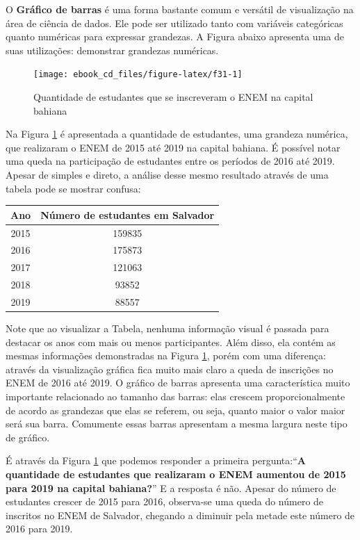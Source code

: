 \documentclass[
  portuguese,
  oneside]{book}
\begin{document}
O \textbf{Gráfico de barras} é uma forma bastante comum e versátil de visualização na área de ciência de dados. Ele pode ser utilizado tanto com variáveis categóricas quanto numéricas para expressar grandezas. A Figura abaixo apresenta uma de suas utilizações: demonstrar grandezas numéricas.

\begin{figure}

{\centering \texttt{[image: ebook\_cd\_files/figure-latex/f31-1]} 

}

\caption{Quantidade de estudantes que se inscreveram o ENEM na capital bahiana}\label{fig:f31}
\end{figure}

Na Figura \ref{fig:f31} é apresentada a quantidade de estudantes, uma grandeza numérica, que realizaram o ENEM de 2015 até 2019 na capital bahiana. É possível notar uma queda na participação de estudantes entre os períodos de 2016 até 2019. Apesar de simples e direto, a análise desse mesmo resultado através de uma tabela pode se mostrar confusa:

\begin{longtable}[]{@{}cc@{}}
\toprule
Ano & Número de estudantes em Salvador\tabularnewline
\midrule
\endhead
2015 & 159835\tabularnewline
2016 & 175873\tabularnewline
2017 & 121063\tabularnewline
2018 & 93852\tabularnewline
2019 & 88557\tabularnewline
\bottomrule
\end{longtable}

Note que ao visualizar a Tabela, nenhuma informação visual é passada para destacar os anos com mais ou menos participantes. Além disso, ela contém as mesmas informações demonstradas na Figura \ref{fig:f31}, porém com uma diferença: através da visualização gráfica fica muito mais claro a queda de inscrições no ENEM de 2016 até 2019. O gráfico de barras apresenta uma característica muito importante relacionado ao tamanho das barras: elas crescem proporcionalmente de acordo as grandezas que elas se referem, ou seja, quanto maior o valor maior será sua barra. Comumente essas barras apresentam a mesma largura neste tipo de gráfico.

É através da Figura \ref{fig:f31} que podemos responder a primeira pergunta:``\textbf{A quantidade de estudantes que realizaram o ENEM aumentou de 2015 para 2019 na capital bahiana?}'' E a resposta é não. Apesar do número de estudantes crescer de 2015 para 2016, observa-se uma queda do número de inscritos no ENEM de Salvador, chegando a diminuir pela metade este número de 2016 para 2019.
\end{document}
